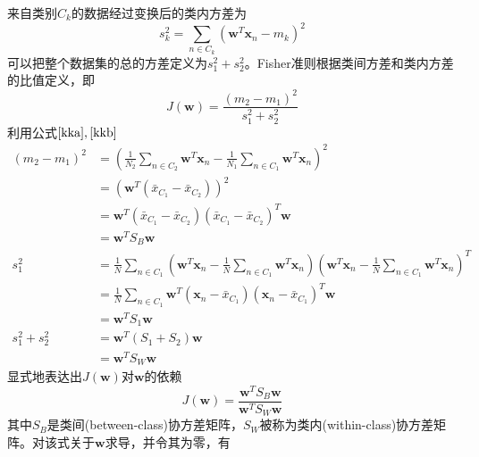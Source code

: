 来自类别$C_k$的数据经过变换后的类内方差为
\begin{equation}
	s_k^2=\sum_{n\in C_k}(\boldsymbol{w}^T\boldsymbol{x}_n-m_k)^2
\end{equation}
可以把整个数据集的总的方差定义为$s_1^2+s_2^2$。Fisher准则根据类间方差和类内方差的比值定义，即
\begin{equation}
	J(\boldsymbol{w})=\frac{(m_2-m_1)^2}{s_1^2+s_2^2}
\end{equation}
利用公式$\ref{kka},\ref{kkb}$
\begin{equation}
	\begin{aligned}
	(m_2-m_1)^2&=\left(\frac{1}{N_2}\sum_{n\in C_2}\boldsymbol{w}^T\boldsymbol{x}_n-\frac{1}{N_1}\sum_{n\in C_1}\boldsymbol{w}^T\boldsymbol{x}_n\right)^2\\
	&=\left(\boldsymbol{w}^T(\bar{x}_{C_1}-\bar{x}_{C_2}) \right)^2\\
	&=\boldsymbol{w}^T(\bar{x}_{C_1}-\bar{x}_{C_2})(\bar{x}_{C_1}-\bar{x}_{C_2})^T\boldsymbol{w} \\
	&=\boldsymbol{w}^TS_B\boldsymbol{w}\\
	s_1^2&=\frac{1}{N}\sum_{n\in C_1}(\boldsymbol{w}^T\boldsymbol{x}_n - \frac{1}{N}\sum_{n\in C_1}\boldsymbol{w}^T\boldsymbol{x}_n)(\boldsymbol{w}^T\boldsymbol{x}_n - \frac{1}{N}\sum_{n\in C_1}\boldsymbol{w}^T\boldsymbol{x}_n)^T\\
	&=\frac{1}{N}\sum_{n\in C_1}\boldsymbol{w}^T(\boldsymbol{x}_n-\bar{x}_{C_1})(\boldsymbol{x}_n-\bar{x}_{C_1})^T\boldsymbol{w}\\
	&=\boldsymbol{w}^TS_1\boldsymbol{w}\\
	s_1^2+s_2^2&=\boldsymbol{w}^T(S_1+S_2)\boldsymbol{w}\\
	&=\boldsymbol{w}^TS_W\boldsymbol{w}
	\end{aligned}
\end{equation}
显式地表达出$J(\boldsymbol{w})$对$\boldsymbol{w}$的依赖
\begin{equation}
	J(\boldsymbol{w})=\frac{\boldsymbol{w}^TS_B\boldsymbol{w}}{\boldsymbol{w}^TS_W\boldsymbol{w}}
\end{equation}
其中$S_B$是类间(between-class)协方差矩阵，$S_W$被称为类内(within-class)协方差矩阵。对该式关于$\boldsymbol{w}$求导，并令其为零，有
